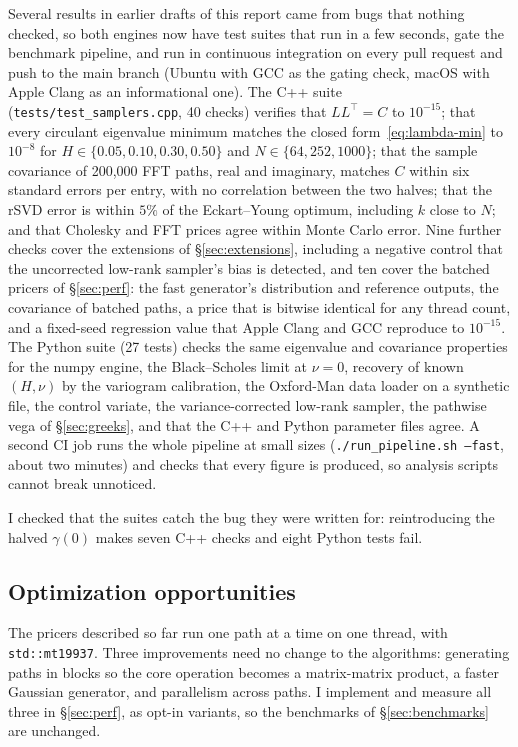 Several results in earlier drafts of this report came from bugs that nothing
checked, so both engines now have test suites that run in a few seconds, gate
the benchmark pipeline, and run in continuous integration on every pull request and
push to the main branch (Ubuntu with GCC as the gating check, macOS with Apple Clang as
an informational one).  The C++ suite (\texttt{tests/test\_samplers.cpp},
40 checks)
verifies that $LL^\top = C$ to $10^{-15}$; that every circulant eigenvalue minimum
matches the closed form~\eqref{eq:lambda-min} to $10^{-8}$ for $H \in
\{0.05, 0.10, 0.30, 0.50\}$ and $N \in \{64, 252, 1000\}$; that the sample covariance of
200{,}000 FFT paths, real and imaginary, matches $C$ within six standard errors per
entry, with no correlation between the two halves; that the rSVD error is within
$5\%$ of the Eckart--Young optimum, including $k$ close to $N$; and that Cholesky and
FFT prices agree within Monte Carlo error.  Nine further checks cover the extensions
of §\ref{sec:extensions}, including a negative control that the uncorrected low-rank
sampler's bias is detected, and ten cover the batched pricers of §\ref{sec:perf}: the
fast generator's distribution and reference outputs, the covariance of batched paths,
a price that is bitwise identical for any thread count, and a fixed-seed regression
value that Apple Clang and GCC reproduce to $10^{-15}$.  The Python suite (27 tests)
checks the same eigenvalue and covariance properties for the numpy engine, the
Black--Scholes limit at $\nu = 0$, recovery of known $(H, \nu)$ by the variogram
calibration, the Oxford-Man data loader on a synthetic file, the control variate, the
variance-corrected low-rank sampler, the pathwise vega of §\ref{sec:greeks}, and that
the C++ and Python parameter files agree.  A second CI job runs the whole pipeline at
small sizes (\texttt{./run\_pipeline.sh --fast}, about two minutes) and checks that
every figure is produced, so analysis scripts cannot break unnoticed.

I checked that the suites catch the bug they were written for: reintroducing the
halved $\gamma(0)$ makes seven C++ checks and eight Python tests fail.

\subsection{Optimization opportunities}
\label{sec:opt-opportunities}

The pricers described so far run one path at a time on one thread, with
\texttt{std::mt19937}.  Three improvements need no change to the algorithms: generating
paths in blocks so the core operation becomes a matrix-matrix product, a faster Gaussian
generator, and parallelism across paths.  I implement and measure all three in
§\ref{sec:perf}, as opt-in variants, so the benchmarks of §\ref{sec:benchmarks} are
unchanged.

